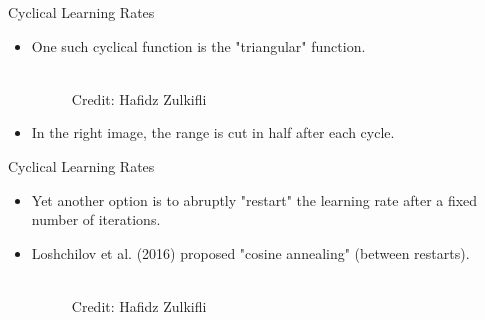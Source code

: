 \begin{frame} {Cyclical Learning Rates}
  \begin{itemize}
    \item One such cyclical function is the "triangular" function.
    \begin{figure}
      \centering
        \tiny{\\Credit: Hafidz Zulkifli}
    \end{figure}
    \item In the right image, the range is cut in half after each cycle.
  \end{itemize}
\end{frame}


\begin{frame} {Cyclical Learning Rates}
  \begin{itemize}
    \item Yet another option is to abruptly "restart" the learning rate after a fixed number of iterations. 
    \item Loshchilov et al. (2016) proposed  "cosine annealing" (between restarts).
    \begin{figure}
      \centering
        \tiny{\\Credit: Hafidz Zulkifli}
    \end{figure}
  \end{itemize}
\end{frame}


